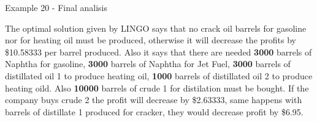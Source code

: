 \begin{frame}{Example 20 - Final analisis}

The optimal solution given by LINGO says that no crack oil barrels for gasoline
nor for heating oil must be produced, otherwise it will decrease the profits by
\$10.58333 per barrel produced. Also it says that there are needed \textbf{3000}
barrels of Naphtha for gasoline, \textbf{3000} barrels of Naphtha for Jet Fuel,
\textbf{3000} barrels of distillated oil 1 to produce heating oil, \textbf{1000}
barrels of distillated oil 2 to produce heating oild. Also \textbf{10000}
barrels of crude 1 for distilation must be bought. If the company buys crude 2
the profit will decrease by \$2.63333, same happens with barrels of distillate
1 produced for cracker, they would decrease profit by \$6.95.

\end{frame}
